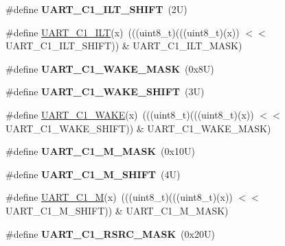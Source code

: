 \begin{DoxyCompactItemize}
\#define {\bfseries U\+A\+R\+T\+\_\+\+C1\+\_\+\+I\+L\+T\+\_\+\+S\+H\+I\+FT}~(2\+U)
\item 
\#define \mbox{\hyperlink{group___u_a_r_t___register___masks_ga1598f03dbad6c945f32558c959ac6395}{U\+A\+R\+T\+\_\+\+C1\+\_\+\+I\+LT}}(x)~(((uint8\+\_\+t)(((uint8\+\_\+t)(x)) $<$$<$ U\+A\+R\+T\+\_\+\+C1\+\_\+\+I\+L\+T\+\_\+\+S\+H\+I\+FT)) \& U\+A\+R\+T\+\_\+\+C1\+\_\+\+I\+L\+T\+\_\+\+M\+A\+SK)
\item 
\mbox{\label{group___u_a_r_t___register___masks_ga84ef48b565c1e3526a3c392b8ce9cf83}} 
\#define {\bfseries U\+A\+R\+T\+\_\+\+C1\+\_\+\+W\+A\+K\+E\+\_\+\+M\+A\+SK}~(0x8\+U)
\item 
\mbox{\label{group___u_a_r_t___register___masks_gac7a94bf100cb9654ac28fe9e58b1db42}} 
\#define {\bfseries U\+A\+R\+T\+\_\+\+C1\+\_\+\+W\+A\+K\+E\+\_\+\+S\+H\+I\+FT}~(3\+U)
\item 
\#define \mbox{\hyperlink{group___u_a_r_t___register___masks_ga3a2197e67db725e3c544ba09ad5e0bbf}{U\+A\+R\+T\+\_\+\+C1\+\_\+\+W\+A\+KE}}(x)~(((uint8\+\_\+t)(((uint8\+\_\+t)(x)) $<$$<$ U\+A\+R\+T\+\_\+\+C1\+\_\+\+W\+A\+K\+E\+\_\+\+S\+H\+I\+FT)) \& U\+A\+R\+T\+\_\+\+C1\+\_\+\+W\+A\+K\+E\+\_\+\+M\+A\+SK)
\item 
\mbox{\label{group___u_a_r_t___register___masks_gabbe5c7cb60072d535d068446606414c5}} 
\#define {\bfseries U\+A\+R\+T\+\_\+\+C1\+\_\+\+M\+\_\+\+M\+A\+SK}~(0x10\+U)
\item 
\mbox{\label{group___u_a_r_t___register___masks_ga591070f161ecf5cf35b0e6927b5e4c77}} 
\#define {\bfseries U\+A\+R\+T\+\_\+\+C1\+\_\+\+M\+\_\+\+S\+H\+I\+FT}~(4\+U)
\item 
\#define \mbox{\hyperlink{group___u_a_r_t___register___masks_ga3af9677680bdf096bee0166fef054578}{U\+A\+R\+T\+\_\+\+C1\+\_\+M}}(x)~(((uint8\+\_\+t)(((uint8\+\_\+t)(x)) $<$$<$ U\+A\+R\+T\+\_\+\+C1\+\_\+\+M\+\_\+\+S\+H\+I\+FT)) \& U\+A\+R\+T\+\_\+\+C1\+\_\+\+M\+\_\+\+M\+A\+SK)
\item 
\mbox{\label{group___u_a_r_t___register___masks_gaaeb3cc3491cd77f71150bfa9cce03518}} 
\#define {\bfseries U\+A\+R\+T\+\_\+\+C1\+\_\+\+R\+S\+R\+C\+\_\+\+M\+A\+SK}~(0x20\+U)
\item 
$$
\end{DoxyCompactItemize}
